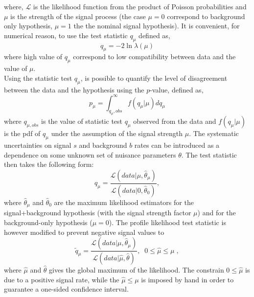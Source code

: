 where, $\mathcal{L}$ is the likelihood function from the product of Poisson probabilities and  $\mu$ is the strength of the signal process (the case $\mu =0$ correspond to background only hypothesis, $\mu=1$ the the nominal signal hypothesis).
It is convenient, for numerical reason, to use the test statistic $q_{\mu}$ defined as,  
\begin{equation}
 q_{\mu}= -2 \ln \lambda (\mu)  \end{equation}
where high value of $q_{\mu}$ correspond to low compatibility between data and the value of $\mu$. \\
Using the statistic test  $q_{\mu}$, is possible to quantify the level of disagreement between the data and the hypothesis using the $p$-value, defined as,
\begin{equation}
  p_{\mu}=  \int_{ q_{\mu},obs }^{\infty } f(q_{\mu}| \mu  ) dq_{\mu}   \end{equation}
where $ q_{\mu,obs} $ is the value of statistic test $q_{\mu}$ observed from the data and $f(q_{\mu}| \mu  )$ is the pdf of $q_{\mu}$ under the assumption of the signal strength $\mu$.
\newline
The systematic uncertainties on signal $s$ and background $b$ rates can be introduced as a dependence on some unknown set of nuisance parameters $\theta$. The test statistic then takes the following form:
\begin{equation}
 q_{\mu} =\frac{\mathcal{L}(data | \mu, \hat{\theta}_{\mu} )  }{ \mathcal{L}(data |0, \hat{\theta}_0 )},  \end{equation}
where $\hat{\theta}_{\mu}$ and $\hat{\theta}_0$ are the maximum likelihood estimators for the signal+background
hypothesis (with the signal strength factor $\mu$) and for the
background-only hypothesis ($\mu =0$). 
The profile likelihood test statistic is however modified to prevent negative signal values to
\begin{equation}
 \tilde{q}_{\mu} =\frac{\mathcal{L}(data | \mu, \hat{\theta}_{\mu} )  }{ \mathcal{L}(data |\hat{\mu}, \hat{\theta} )}, \; \; 0 \leq \hat{\mu} \leq \mu \; ,  \end{equation}
where $\hat{\mu}$ and $\hat{\theta}$ gives the global maximum of the likelihood. 
The constrain  $0 \leq \hat{\mu}$ is due to a positive signal rate, while the   $\hat{\mu} \leq \mu$ is imposed by hand in order to guarantee a one-sided  confidence interval.\\
